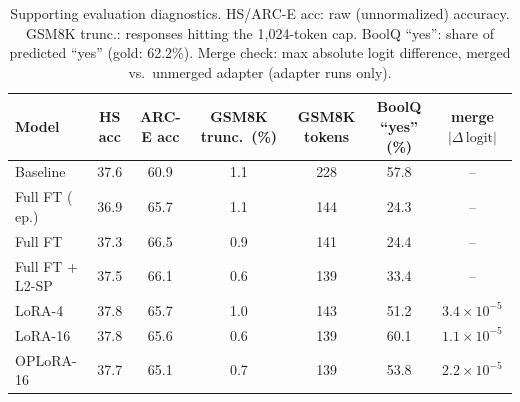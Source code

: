 \begin{table}[t]
\centering
\footnotesize
\setlength{\tabcolsep}{3.0pt}
\caption{Supporting evaluation diagnostics. HS/ARC-E acc: raw (unnormalized) accuracy. GSM8K trunc.: responses hitting the 1{,}024-token cap. BoolQ ``yes'': share of predicted ``yes'' (gold: 62.2\%). Merge check: max absolute logit difference, merged vs.\ unmerged adapter (adapter runs only).}
\label{tab:extra}
\begin{tabular}{lcccccc}
\toprule
Model & HS acc & ARC-E acc & GSM8K trunc.\ (\%) & GSM8K tokens & BoolQ ``yes'' (\%) & merge $|\Delta\,\mathrm{logit}|$ \\
\midrule
Baseline & 37.6 & 60.9 & 1.1 & 228 & 57.8 & -- \\
\midrule
Full FT (\textonehalf{} ep.) & 36.9 & 65.7 & 1.1 & 144 & 24.3 & -- \\
Full FT & 37.3 & 66.5 & 0.9 & 141 & 24.4 & -- \\
Full FT + L2-SP & 37.5 & 66.1 & 0.6 & 139 & 33.4 & -- \\
LoRA-4 & 37.8 & 65.7 & 1.0 & 143 & 51.2 & $3.4\times10^{-5}$ \\
LoRA-16 & 37.8 & 65.6 & 0.6 & 139 & 60.1 & $1.1\times10^{-5}$ \\
OPLoRA-16 & 37.7 & 65.1 & 0.7 & 139 & 53.8 & $2.2\times10^{-5}$ \\
\bottomrule
\end{tabular}
\end{table}
